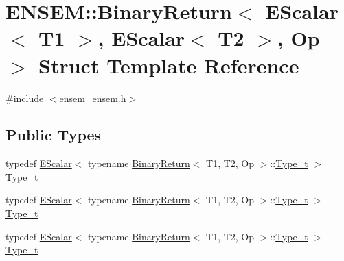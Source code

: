 \hypertarget{structENSEM_1_1BinaryReturn_3_01EScalar_3_01T1_01_4_00_01EScalar_3_01T2_01_4_00_01Op_01_4}{}\section{E\+N\+S\+EM\+:\+:Binary\+Return$<$ E\+Scalar$<$ T1 $>$, E\+Scalar$<$ T2 $>$, Op $>$ Struct Template Reference}
\label{structENSEM_1_1BinaryReturn_3_01EScalar_3_01T1_01_4_00_01EScalar_3_01T2_01_4_00_01Op_01_4}


{\ttfamily \#include $<$ensem\+\_\+ensem.\+h$>$}

\subsection*{Public Types}
\begin{DoxyCompactItemize}
\item 
typedef \mbox{\hyperlink{classENSEM_1_1EScalar}{E\+Scalar}}$<$ typename \mbox{\hyperlink{structENSEM_1_1BinaryReturn}{Binary\+Return}}$<$ T1, T2, Op $>$\+::\mbox{\hyperlink{structENSEM_1_1BinaryReturn_3_01EScalar_3_01T1_01_4_00_01EScalar_3_01T2_01_4_00_01Op_01_4_ab1c1fc79ebef8ef1bc2790edad248056}{Type\+\_\+t}} $>$ \mbox{\hyperlink{structENSEM_1_1BinaryReturn_3_01EScalar_3_01T1_01_4_00_01EScalar_3_01T2_01_4_00_01Op_01_4_ab1c1fc79ebef8ef1bc2790edad248056}{Type\+\_\+t}}
\item 
typedef \mbox{\hyperlink{classENSEM_1_1EScalar}{E\+Scalar}}$<$ typename \mbox{\hyperlink{structENSEM_1_1BinaryReturn}{Binary\+Return}}$<$ T1, T2, Op $>$\+::\mbox{\hyperlink{structENSEM_1_1BinaryReturn_3_01EScalar_3_01T1_01_4_00_01EScalar_3_01T2_01_4_00_01Op_01_4_ab1c1fc79ebef8ef1bc2790edad248056}{Type\+\_\+t}} $>$ \mbox{\hyperlink{structENSEM_1_1BinaryReturn_3_01EScalar_3_01T1_01_4_00_01EScalar_3_01T2_01_4_00_01Op_01_4_ab1c1fc79ebef8ef1bc2790edad248056}{Type\+\_\+t}}
\item 
typedef \mbox{\hyperlink{classENSEM_1_1EScalar}{E\+Scalar}}$<$ typename \mbox{\hyperlink{structENSEM_1_1BinaryReturn}{Binary\+Return}}$<$ T1, T2, Op $>$\+::\mbox{\hyperlink{structENSEM_1_1BinaryReturn_3_01EScalar_3_01T1_01_4_00_01EScalar_3_01T2_01_4_00_01Op_01_4_ab1c1fc79ebef8ef1bc2790edad248056}{Type\+\_\+t}} $>$ \mbox{\hyperlink{structENSEM_1_1BinaryReturn_3_01EScalar_3_01T1_01_4_00_01EScalar_3_01T2_01_4_00_01Op_01_4_ab1c1fc79ebef8ef1bc2790edad248056}{Type\+\_\+t}}
\end{DoxyCompactItemize}


